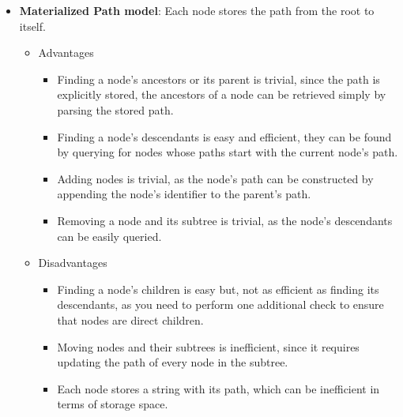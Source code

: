 \begin{itemize}
  \item \textbf{Materialized Path model}: Each node stores the path from the root to itself.
    \begin{itemize}
      \item Advantages
        \begin{itemize}
        \item Finding a node’s ancestors or its parent is trivial, since the path is explicitly stored,
          the ancestors of a node can be retrieved simply by parsing the stored path.
        \item Finding a node’s descendants is easy and efficient, they can be found by
          querying for nodes whose paths start with the current node's path.
        \item Adding nodes is trivial, as the node's path can be constructed by appending
          the node's identifier to the parent's path.
        \item Removing a node and its subtree is trivial, as the node's descendants can be
          easily queried.
      \end{itemize}
      \item Disadvantages
        \begin{itemize}
          \item Finding a node's children is easy but, not as efficient as finding its
            descendants, as you need to perform one additional check to ensure that nodes
            are direct children.
        \item Moving nodes and their subtrees is inefficient, since it requires updating
          the path of every node in the subtree. 
        \item Each node stores a string with its path, which can be inefficient in terms of
          storage space.
        \end{itemize}
    \end{itemize}
\end{itemize}


\newcommand{\goodcomplexity}[1]{\vspace{.4em}\textcolor{darkgreen}{\checkmark}\vspace{.4em}}
\newcommand{\mediumcomplexity}[1]{\vspace{.4em}\textcolor{orange}{\textcircled{}}\vspace{.4em}}
\newcommand{\badcomplexity}[1]{\vspace{.4em}\textcolor{red}{X}\vspace{.4em}}

